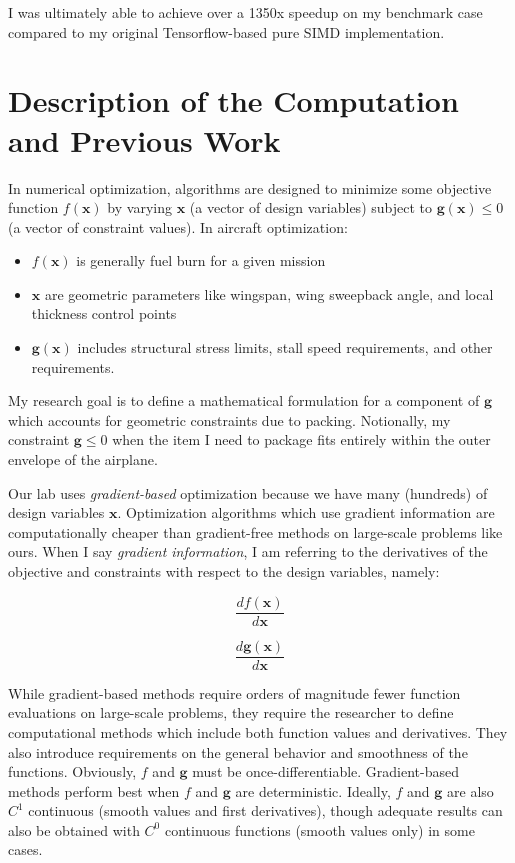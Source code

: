 \documentclass[11pt,letterpaper]{article}
\begin{document}
\qquad I was ultimately able to achieve over a 1350x speedup on my benchmark case compared to my original Tensorflow-based pure SIMD implementation.

\section{Description of the Computation and Previous Work}
In numerical optimization, algorithms are designed to minimize some objective function $f(\textbf{x})$ by varying $\textbf{x}$ (a vector of design variables)
subject to $\textbf{g}(\textbf{x}) \leq 0$ (a vector of constraint values).
In aircraft optimization:
\begin{itemize}
 \item $f(\textbf{x})$ is generally fuel burn for a given mission
 \item $\textbf{x}$ are geometric parameters like wingspan, wing sweepback angle, and local thickness control points
 \item $\textbf{g}(\textbf{x})$ includes structural stress limits, stall speed requirements, and other requirements.
\end{itemize}
My research goal is to define a mathematical formulation for a component of $\textbf{g}$ which accounts for geometric constraints due to packing.
Notionally, my constraint $\textbf{g} \leq 0$ when the item I need to package fits entirely within the outer envelope of the airplane.

\qquad Our lab uses \emph{gradient-based} optimization because we have many (hundreds) of design variables $\textbf{x}$.
Optimization algorithms which use gradient information are computationally cheaper than gradient-free methods on large-scale problems like ours.
When I say \emph{gradient information}, I am referring to the derivatives of the objective and constraints with respect to the design variables, namely:

\begin{equation}
    \frac{df(\textbf{x})}{d\textbf{x}}
\end{equation}

\begin{equation}
    \frac{d\textbf{g}(\textbf{x})}{d\textbf{x}}
\end{equation}

\qquad While gradient-based methods require orders of magnitude fewer function evaluations on large-scale problems, they require the researcher to define computational methods which include both function values and derivatives.
They also introduce requirements on the general behavior and smoothness of the functions.
Obviously, $f$ and $\textbf{g}$ must be once-differentiable.
Gradient-based methods perform best when $f$ and $\textbf{g}$ are deterministic.
Ideally, $f$ and $\textbf{g}$ are also $C^1$ continuous (smooth values and first derivatives), though adequate results can also be obtained with $C^0$ continuous functions (smooth values only) in some cases.
\end{document}
